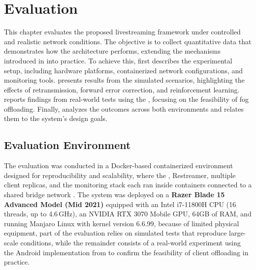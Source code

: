 %
\chapter{Evaluation}
\label{Evaluation}
%

\quad This chapter evaluates the proposed livestreaming framework under controlled and realistic network conditions. The objective is to collect quantitative data that demonstrates how the architecture performs, extending the mechanisms introduced in \textbf{} into practice. To achieve this, \textbf{} first describes the experimental setup, including hardware platforms, containerized network configurations, and monitoring tools. \textbf{} presents results from the simulated scenarios, highlighting the effects of retransmission, forward error correction, and reinforcement learning. \textbf{} reports findings from real-world tests using the \textbf{}, focusing on the feasibility of fog offloading. Finally, \textbf{} analyzes the outcomes across both environments and relates them to the system’s design goals.

\section{Evaluation Environment}
\label{sec:evaluation environment}

\quad The evaluation was conducted in a Docker-based containerized environment designed for reproducibility and scalability, where the , Restreamer, multiple client replicas, and the monitoring stack each ran inside containers connected to a shared bridge network \textbf{}. The system was deployed on a \textbf{Razer Blade 15 Advanced Model (Mid 2021)} equipped with an Intel i7-11800H CPU (16 threads, up to 4.6\,GHz), an NVIDIA RTX 3070 Mobile GPU, 64GB of RAM, and running Manjaro Linux with kernel version 6.6.99, because of limited physical equipment, part of the evaluation relies on simulated tests that reproduce large-scale conditions, while the remainder consists of a real-world experiment using the Android implementation from \textbf{} to confirm the feasibility of client offloading in practice.

